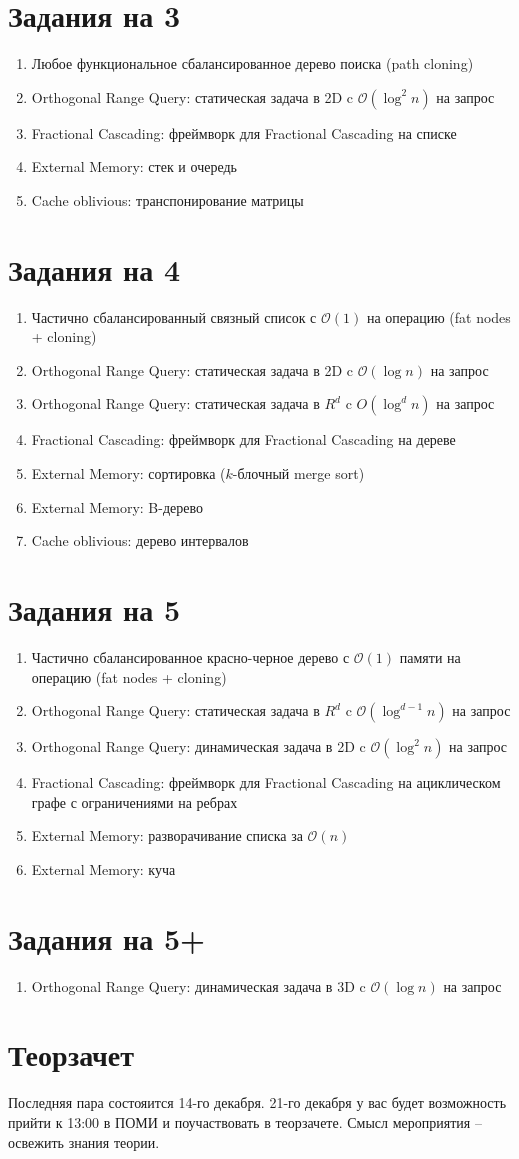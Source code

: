 \documentclass[12pt]{article}
\def\O{\mathcal{O}}
\newenvironment{MyList}{
  \begin{enumerate}
  \setlength{\parskip}{-5pt}
  \setlength{\itemsep}{5pt}
}{
  \vspace*{-1em}
  \end{enumerate}
}
\newcommand\Section[1]{\vspace*{-1em}\section{#1}}
\begin{document}
\Section{Задания на 3}
\begin{MyList}
\item Любое функциональное сбалансированное дерево поиска (path cloning)
\item Orthogonal Range Query: статическая задача в 2D c $\O(\log^2 n)$ на запрос
\item Fractional Cascading: фреймворк для Fractional Cascading на списке
\item External Memory: стек и очередь
\item Cache oblivious: транспонирование матрицы
\end{MyList}
\Section{Задания на 4}
\begin{MyList}
\item Частично сбалансированный связный список с $\O(1)$ на операцию (fat nodes + cloning)
\item Orthogonal Range Query: статическая задача в 2D c $\O(\log n)$ на запрос
\item Orthogonal Range Query: статическая задача в $R^d$ c $O(\log^d n)$ на запрос
\item Fractional Cascading: фреймворк для Fractional Cascading на дереве
\item External Memory: сортировка ($k$-блочный merge sort)
\item External Memory: B-дерево
\item Cache oblivious: дерево интервалов 
\end{MyList}
\Section{Задания на 5}
\begin{MyList}
\item Частично сбалансированное красно-черное дерево с $\O(1)$ памяти на операцию (fat nodes + cloning)
\item Orthogonal Range Query: статическая задача в $R^d$ c $\O(\log^{d-1}n)$ на запрос
\item Orthogonal Range Query: динамическая задача в 2D c $\O(\log^2 n)$ на запрос
\item Fractional Cascading: фреймворк для Fractional Cascading на ациклическом графе с ограничениями на ребрах
\item External Memory: разворачивание списка за $\O(n)$
\item External Memory: куча
\end{MyList}
\Section{Задания на 5+}
\begin{MyList}
\item Orthogonal Range Query: динамическая задача в 3D c $\O(\log n)$ на запрос
\end{MyList}

\Section{Теорзачет}

Последняя пара состояится 14-го декабря.
21-го декабря у вас будет возможность прийти к
13:00 в ПОМИ и поучаствовать в теорзачете.
Смысл мероприятия -- освежить знания теории.
\end{document}
